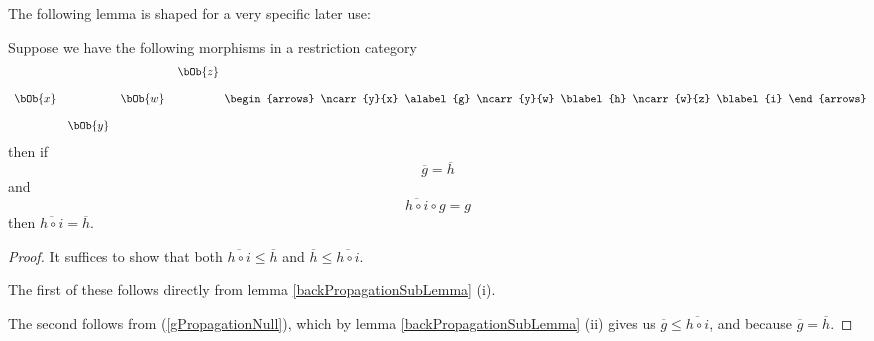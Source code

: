 \begin{oldtt}
The following lemma is shaped for a very specific later use:
\begin{lemma}
Suppose we have the following morphisms in a restriction category
\[
\begin{array} {c c c c c}
       &        &        &         &\kern-0.3cm\bOb{z}  \\[0.4cm]
\bOb{x}&        &\bOb{w}                     \\[0.4cm]
       & \bOb{y} 
\end{array}
\begin{arrows}
\ncarr{y}{x} \alabel{g}
\ncarr{y}{w} \blabel{h}
\ncarr{w}{z} \blabel{i}
\end{arrows}
\]
then if 
\begin{equation}
\label{ghTight}
\overline{g}=\overline{h}
 \end{equation}
 and 
 \begin{equation}
 \label{gPropagationNull}
 \overline{h \circ i} \circ g = g
 \end{equation}
 then
$\overline{h \circ i} = \overline{h}$. 
\end{lemma}
\begin{proof}
It suffices to show that both $\overline{h \circ i} \leq \overline{h}$
and $\overline{h} \leq \overline{h \circ i}$.

The first of these 
follows directly from lemma \ref{backPropagationSubLemma} (i).

The second follows from (\ref{gPropagationNull}), 
which by lemma \ref{backPropagationSubLemma} (ii)
gives us
$\overline{g} \leq \overline{h \circ i}$, and because $\overline{g} = \overline{h}$.
\end{proof}
\end{oldtt}